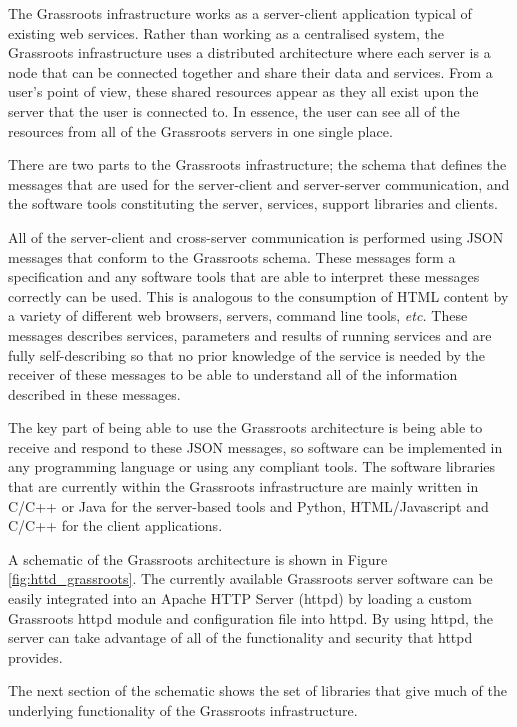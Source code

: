 \documentclass[9pt,a4paper]{extarticle}
\begin{document}
The Grassroots infrastructure works as a server-client application typical of existing web services. 
Rather than working as a centralised system, the Grassroots infrastructure uses a distributed architecture where each server is a node that can be connected together and share their data and services. 
From a user's point of view, these shared resources appear as they all exist upon the server that the user is connected to.
In essence, the user can see all of the resources from all of the Grassroots servers in one single place.

There are two parts to the Grassroots infrastructure; the schema that defines the messages that are used for the server-client and server-server communication, and the software tools constituting the server, services, support libraries and clients.

All of the server-client and cross-server communication is performed using JSON\cite{JSON} messages that conform to the Grassroots schema. 
These messages form a specification and any software tools that are able to interpret these messages correctly can be used. 
This is analogous to the consumption of HTML content by a variety of different web browsers, servers, command line tools, \textit{etc.} 
These messages describes services, parameters and results of running services and are fully self-describing so that no prior knowledge of the service is needed by the receiver of these messages to be able to understand all of the information described in these messages. 

The key part of being able to use the Grassroots architecture is being able to receive and respond to these JSON messages, so software can be implemented in any programming language or using any compliant tools.
The software libraries that are currently within the Grassroots infrastructure are mainly written in C/C++ or Java for the server-based tools and Python, HTML/Javascript and C/C++ for the client applications.

A schematic of the Grassroots architecture is shown in Figure \ref{fig:httd_grassroots}. The currently available Grassroots server software can be easily integrated into an Apache HTTP Server (httpd)\cite{httpd} by loading a custom Grassroots httpd module and configuration file into httpd. By using httpd, the server can take advantage of all of the functionality and security that httpd provides.  

The next section of the schematic shows the set of libraries that give much of the underlying functionality of the Grassroots infrastructure. 
\end{document}
